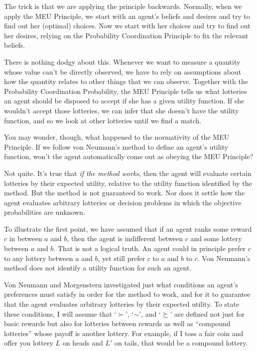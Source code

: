 The trick is that we are applying the principle backwards. Normally,
when we apply the MEU Principle, we start with an agent's beliefs and
desires and try to find out her (optimal) choices. Now we start with her
choices and try to find out her desires, relying on the Probability
Coordination Principle to fix the relevant beliefs.

There is nothing dodgy about this. Whenever we want to measure a
quantity whose value can't be directly observed, we have to rely on
assumptions about how the quantity relates to other things that we can
observe. Together with the Probability Coordination Probability, the
MEU Principle tells us what lotteries an agent should be disposed to
accept if she has a given utility function. If she wouldn't accept
those lotteries, we can infer that she doesn't have the utility
function, and so we look at other lotteries until we find a match.

You may wonder, though, what happened to the normativity of the MEU
Principle. If we follow von Neumann's method to define an agent's
utility function, won't the agent automatically come out as obeying
the MEU Principle?

Not quite. It's true that \emph{if the method works}, then the agent will
evaluate certain lotteries by their expected utility, relative to the utility
function identified by the method. But the method is not guaranteed to work. Nor
does it settle how the agent evaluates arbitrary lotteries or decision problems
in which the objective probabilities are unknown.

To illustrate the first point, we have assumed that if an agent ranks
some reward $c$ in between $a$ and $b$, then the agent is indifferent
between $c$ and some lottery between $a$ and $b$. That is not a
logical truth. An agent could in principle prefer $c$ to any lottery
between $a$ and $b$, yet still prefer $c$ to $a$ and $b$ to $c$. Von
Neumann's method does not identify a utility function for such an
agent.

Von Neumann and Morgenstern investigated just what conditions an
agent's preferences must satisfy in order for the method to work, and
for it to guarantee that the agent evaluates arbitrary lotteries by
their expected utility. To state these conditions, I will assume that
`$\succ$', `$\sim$', and `$\succsim$' are defined not just for basic
rewards but also for lotteries between rewards as well as ``compound
lotteries'' whose payoff is another lottery. For example, if I toss a
fair coin and offer you lottery $L$ on heads and $L'$ on tails, that
would be a compound lottery.

